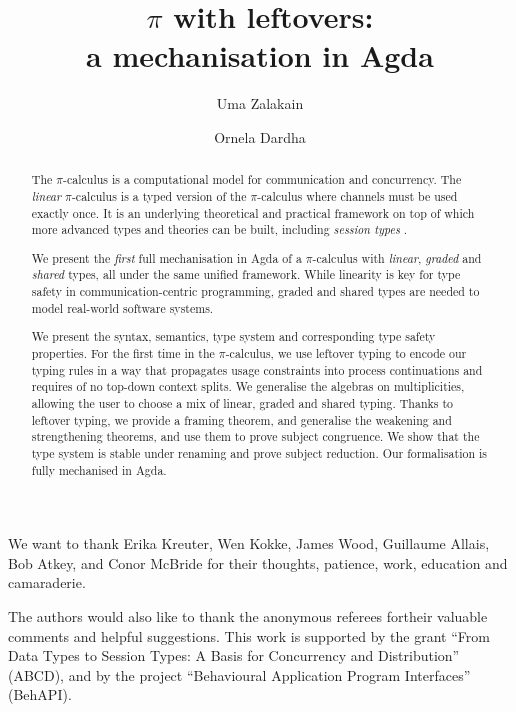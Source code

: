 \documentclass[sigplan,10pt,anonymous,review]{acmart}
\title[$\pi$ with leftovers: a mechanisation in Agda]{$\pi$ with leftovers: \\ a mechanisation in Agda}
\author{Uma Zalakain}
\affiliation{University of Glasgow, Scotland}
\author{Ornela Dardha}
\affiliation{University of Glasgow, Scotland}
\theoremstyle{definition}
\newcommand{\picalc}{$\pi$-calculus}
\begin{document}
\begin{acks}
We want to thank Erika Kreuter, Wen Kokke, James Wood, Guillaume Allais, Bob Atkey, and Conor McBride for their thoughts, patience, work, education and camaraderie.

The authors would also like to thank the anonymous referees fortheir valuable comments and helpful suggestions. This work is supported by the  grant  ``From Data Types to Session Types: A Basis for Concurrency and Distribution'' (ABCD), and by the  project  ``Behavioural Application Program Interfaces'' (BehAPI).
\end{acks}

\begin{abstract}
  The \picalc{} is a computational model for communication and concurrency.
  The \emph{linear} \picalc{} is a typed version of the \picalc{} where channels must be used exactly once.
  It is an underlying theoretical and practical framework on top of which more advanced types and theories can be built, including \emph{session types} \cite{H93,THK94,HVK98}.

  We present the \emph{first} full mechanisation in Agda of a \picalc{} with \emph{linear}, \emph{graded} and \emph{shared} types, all under the same unified framework.
  While linearity is key for type safety in communication-centric programming, graded and shared types are needed to model real-world software systems.
  
  We present the syntax, semantics, type system and corresponding type safety properties.
  For the first time in the \picalc{}, we use leftover typing \cite{Allais2018a} to encode our typing rules in a way that propagates usage constraints into process continuations and requires of no top-down context splits.
  We generalise the algebras on multiplicities, allowing the user to choose a mix of linear, graded and shared typing.
  Thanks to leftover typing, we provide a framing theorem, and generalise the weakening and strengthening theorems, and use them to prove subject congruence.
  We show that the type system is stable under renaming and prove subject reduction.
%
  Our formalisation is fully mechanised in Agda.
\end{abstract}

\maketitle
\end{document}
